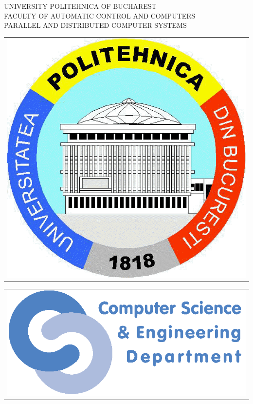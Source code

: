 \thispagestyle{empty}
\begin{center}
\large
UNIVERSITY POLITEHNICA OF BUCHAREST \\
FACULTY OF AUTOMATIC CONTROL AND COMPUTERS \\
PARALLEL AND DISTRIBUTED COMPUTER SYSTEMS \\

\begin{tabular}[t]{@{}l}
	\includegraphics[scale=0.16]{figures/logos/upb.png}
\end{tabular}
\hfill
\begin{tabular}[t]{l@{}}
	\includegraphics[scale=0.3]{figures/logos/cse.png}
\end{tabular}
\vfill\noindent


\end{center}
